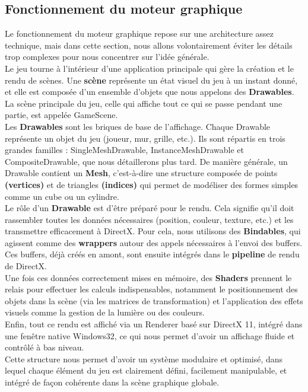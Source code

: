 \subsection{Fonctionnement du moteur graphique}
Le fonctionnement du moteur graphique repose sur une architecture assez technique, mais dans cette section, nous allons volontairement éviter les détails trop complexes pour nous concentrer sur l’idée générale. \\
Le jeu tourne à l’intérieur d’une application principale qui gère la création et le rendu de scènes. Une \textbf{scène} représente un état visuel du jeu à un instant donné, et elle est composée d’un ensemble d’objets que nous appelons des \textbf{Drawables}. La scène principale du jeu, celle qui affiche tout ce qui se passe pendant une partie, est appelée GameScene. \\
Les \textbf{Drawables} sont les briques de base de l’affichage. Chaque Drawable représente un objet du jeu (joueur, mur, grille, etc.). Ils sont répartis en trois grandes familles : SingleMeshDrawable, InstanceMeshDrawable et CompositeDrawable, que nous détaillerons plus tard. De manière générale, un Drawable contient un \textbf{Mesh}, c’est-à-dire une structure composée de points \textbf{(vertices)} et de triangles \textbf{(indices)} qui permet de modéliser des formes simples comme un cube ou un cylindre. \\
Le rôle d’un \textbf{Drawable} est d’être préparé pour le rendu. Cela signifie qu’il doit rassembler toutes les données nécessaires (position, couleur, texture, etc.) et les transmettre efficacement à DirectX. Pour cela, nous utilisons des \textbf{Bindables}, qui agissent comme des \textbf{wrappers} autour des appels nécessaires à l’envoi des buffers. Ces buffers, déjà créés en amont, sont ensuite intégrés dans le \textbf{pipeline} de rendu de DirectX. \\
Une fois ces données correctement mises en mémoire, des \textbf{Shaders} prennent le relais pour effectuer les calculs indispensables, notamment le positionnement des objets dans la scène (via les matrices de transformation) et l’application des effets visuels comme la gestion de la lumière ou des couleurs. \\
Enfin, tout ce rendu est affiché via un Renderer basé sur DirectX 11, intégré dans une fenêtre native Windows32, ce qui nous permet d’avoir un affichage fluide et contrôlé à bas niveau. \\
Cette structure nous permet d’avoir un système modulaire et optimisé, dans lequel chaque élément du jeu est clairement défini, facilement manipulable, et intégré de façon cohérente dans la scène graphique globale. \\

